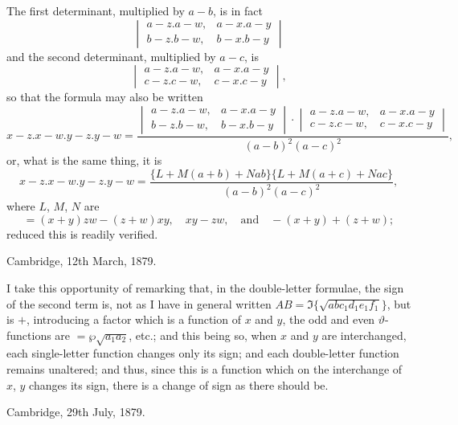 \documentclass[11pt,a4paper]{book}
\begin{document}
The first determinant, multiplied by $a - b$, is in fact
\[
\begin{vmatrix} a - z . a - w, & a - x . a - y \\ b - z . b - w, & b - x . b - y \end{vmatrix}
\]
and the second determinant, multiplied by $a - c$, is
\[
\begin{vmatrix} a - z . a - w, & a - x . a - y \\ c - z . c - w, & c - x . c - y \end{vmatrix},
\]
so that the formula may also be written
\[
x - z . x - w . y - z . y - w = \frac{\begin{vmatrix} a - z . a - w, & a - x . a - y \\ b - z . b - w, & b - x . b - y \end{vmatrix} \cdot \begin{vmatrix} a - z . a - w, & a - x . a - y \\ c - z . c - w, & c - x . c - y \end{vmatrix}}{(a - b)^2 (a - c)^2},
\]
or, what is the same thing, it is
\[
x - z . x - w . y - z . y - w = \frac{\{L + M(a + b) + Nab\}\{L + M(a + c) + Nac\}}{(a - b)^2 (a - c)^2},
\]
where $L$, $M$, $N$ are
\[
= (x + y)zw - (z + w)xy,\quad xy - zw,\quad \text{and}\quad -(x + y) + (z + w);
\]
reduced this is readily verified.

\vspace{1em}

\begin{flushright}
Cambridge, 12th March, 1879.
\end{flushright}

\vspace{1em}

I take this opportunity of remarking that, in the double-letter formulae, the sign of the second term is, not as I have in general written $AB = \Im\{\sqrt{abc_1 d_1 e_1 f_1}\}$, but is $+$, introducing a factor which is a function of $x$ and $y$, the odd and even $\vartheta$-functions are $= \wp\sqrt{a_1 a_2}$, etc.; and this being so, when $x$ and $y$ are interchanged, each single-letter function changes only its sign; and each double-letter function remains unaltered; and thus, since this is a function which on the interchange of $x$, $y$ changes its sign, there is a change of sign as there should be.

\vspace{1em}

\begin{flushright}
Cambridge, 29th July, 1879.
\end{flushright}
\end{document}
